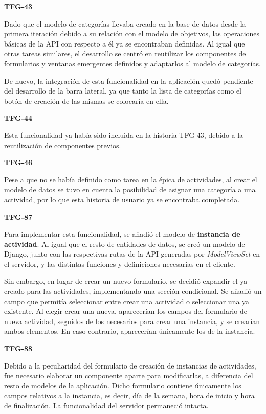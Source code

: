 \documentclass[10pt, a4paper]{aqademic}
\begin{document}
\medskip

\textbf{TFG-43}

Dado que el modelo de categorías llevaba creado en la base de datos desde la primera iteración debido a su relación con el modelo de objetivos, las operaciones básicas de la API con respecto a él ya se encontraban definidas. Al igual que otras tareas similares, el desarrollo se centró en reutilizar los componentes de formularios y ventanas emergentes definidos y adaptarlos al modelo de categorías. 

De nuevo, la integración de esta funcionalidad en la aplicación quedó pendiente del desarrollo de la barra lateral, ya que tanto la lista de categorías como el botón de creación de las mismas se colocaría en ella. 

\medskip

\textbf{TFG-44}

Esta funcionalidad ya había sido incluida en la historia TFG-43, debido a la reutilización de componentes previos.

\medskip

\textbf{TFG-46}

Pese a que no se había definido como tarea en la épica de actividades, al crear el modelo de datos se tuvo en cuenta la posibilidad de asignar una categoría a una actividad, por lo que esta historia de usuario ya se encontraba completada.

\medskip

\textbf{TFG-87}

Para implementar esta funcionalidad, se añadió el modelo de \textbf{instancia de actividad}. Al igual que el resto de entidades de datos, se creó un modelo de Django, junto con las respectivas rutas de la API generadas por \textit{ModelViewSet} en el servidor, y las distintas funciones y definiciones necesarias en el cliente.

Sin embargo, en lugar de crear un nuevo formulario, se decidió expandir el ya creado para las actividades, implementando una sección condicional. Se añadió un campo que permitía seleccionar entre crear una actividad o seleccionar una ya existente. Al elegir crear una nueva, aparecerían los campos del formulario de nueva actividad, seguidos de los necesarios para crear una instancia, y se crearían ambos elementos. En caso contrario, aparecerían únicamente los de la instancia.

\medskip

\textbf{TFG-88}

Debido a la peculiaridad del formulario de creación de instancias de actividades, fue necesario elaborar un componente aparte para modificarlas, a diferencia del resto de modelos de la aplicación. Dicho formulario contiene únicamente los campos relativos a la instancia, es decir, día de la semana, hora de inicio y hora de finalización. La funcionalidad del servidor permaneció intacta.
\end{document}
